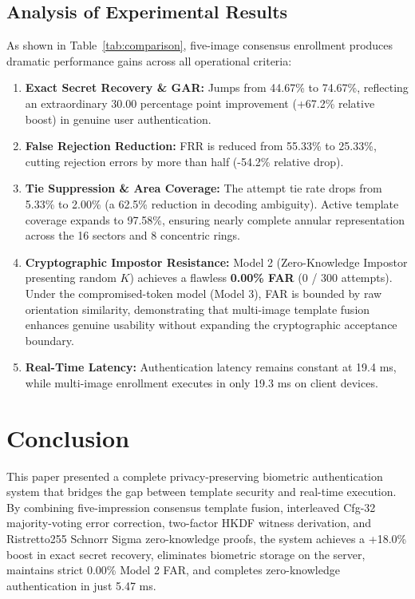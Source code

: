 \documentclass[conference]{IEEEtran}
\begin{document}
\subsection{Analysis of Experimental Results}
As shown in Table~\ref{tab:comparison}, five-image consensus enrollment produces dramatic performance gains across all operational criteria:
\begin{enumerate}
    \item \textbf{Exact Secret Recovery \& GAR:} Jumps from 44.67\% to 74.67\%, reflecting an extraordinary 30.00 percentage point improvement (+67.2\% relative boost) in genuine user authentication.
    \item \textbf{False Rejection Reduction:} FRR is reduced from 55.33\% to 25.33\%, cutting rejection errors by more than half (-54.2\% relative drop).
    \item \textbf{Tie Suppression \& Area Coverage:} The attempt tie rate drops from 5.33\% to 2.00\% (a 62.5\% reduction in decoding ambiguity). Active template coverage expands to 97.58\%, ensuring nearly complete annular representation across the 16 sectors and 8 concentric rings.
    \item \textbf{Cryptographic Impostor Resistance:} Model 2 (Zero-Knowledge Impostor presenting random $K$) achieves a flawless \textbf{0.00\% FAR} (0 / 300 attempts). Under the compromised-token model (Model 3), FAR is bounded by raw orientation similarity, demonstrating that multi-image template fusion enhances genuine usability without expanding the cryptographic acceptance boundary.
    \item \textbf{Real-Time Latency:} Authentication latency remains constant at 19.4 ms, while multi-image enrollment executes in only 19.3 ms on client devices.
\end{enumerate}

\section{Conclusion}
This paper presented a complete privacy-preserving biometric authentication system that bridges the gap between template security and real-time execution. By combining five-impression consensus template fusion, interleaved Cfg-32 majority-voting error correction, two-factor HKDF witness derivation, and Ristretto255 Schnorr Sigma zero-knowledge proofs, the system achieves a +18.0\% boost in exact secret recovery, eliminates biometric storage on the server, maintains strict 0.00\% Model 2 FAR, and completes zero-knowledge authentication in just 5.47 ms.



\end{document}
